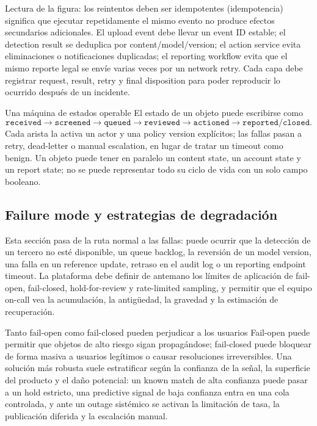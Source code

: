 \documentclass[a4paper]{article}
\begin{document}
\begin{knowledgebox}{Lectura de la figura: los reintentos deben ser idempotentes}
 (idempotencia) significa que ejecutar repetidamente el mismo evento no produce efectos secundarios adicionales. El upload event debe llevar un event ID estable; el detection result se deduplica por content/model/version; el action service evita eliminaciones o notificaciones duplicadas; el reporting workflow evita que el mismo reporte legal se envíe varias veces por un network retry. Cada capa debe registrar request, result, retry y final disposition para poder reproducir lo ocurrido después de un incidente.
\end{knowledgebox}

\begin{importantbox}{Una máquina de estados operable}
El estado de un objeto puede escribirse como
\[
\texttt{received}\rightarrow\texttt{screened}\rightarrow
\texttt{queued}\rightarrow\texttt{reviewed}\rightarrow
\texttt{actioned}\rightarrow\texttt{reported/closed}.
\]
Cada arista la activa un actor y una policy version explícitos; las fallas pasan a retry, dead-letter o manual escalation, en lugar de tratar un timeout como benign. Un objeto puede tener en paralelo un content state, un account state y un report state; no se puede representar todo su ciclo de vida con un solo campo booleano.
\end{importantbox}

\subsection{Failure mode y estrategias de degradación}

Esta sección pasa de la ruta normal a las fallas: puede ocurrir que la detección de un tercero no esté disponible, un queue backlog, la reversión de un model version, una falla en un reference update, retraso en el audit log o un reporting endpoint timeout. La plataforma debe definir de antemano los límites de aplicación de fail-open, fail-closed, hold-for-review y rate-limited sampling, y permitir que el equipo on-call vea la acumulación, la antigüedad, la gravedad y la estimación de recuperación.

\begin{warningbox}{Tanto fail-open como fail-closed pueden perjudicar a los usuarios}
Fail-open puede permitir que objetos de alto riesgo sigan propagándose; fail-closed puede bloquear de forma masiva a usuarios legítimos o causar resoluciones irreversibles. Una solución más robusta suele estratificar según la confianza de la señal, la superficie del producto y el daño potencial: un known match de alta confianza puede pasar a un hold estricto, una predictive signal de baja confianza entra en una cola controlada, y ante un outage sistémico se activan la limitación de tasa, la publicación diferida y la escalación manual.
\end{warningbox}
\end{document}
